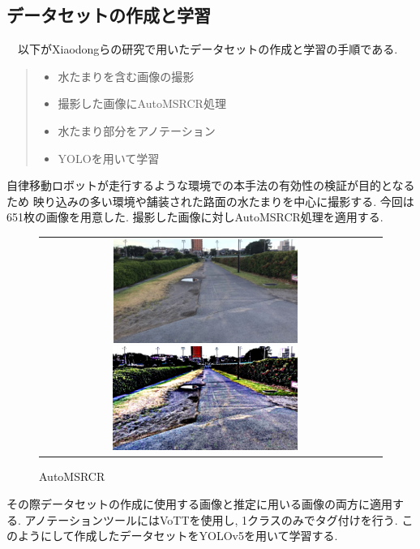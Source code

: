 \documentclass[10pt]{jarticle}
\begin{document}
    \subsection{データセットの作成と学習}
    　以下がXiaodongらの研究で用いたデータセットの作成と学習の手順である. 
    \begin{quote}
        \begin{itemize}
         \item 水たまりを含む画像の撮影
         \item 撮影した画像にAutoMSRCR処理
         \item 水たまり部分をアノテーション
         \item YOLOを用いて学習
        \end{itemize}
       \end{quote}
    自律移動ロボットが走行するような環境での本手法の有効性の検証が目的となるため
    映り込みの多い環境や舗装された路面の水たまりを中心に撮影する. 今回は651枚の画像を用意した. 
    撮影した画像に対しAutoMSRCR処理を適用する. 
    \begin{figure}[H]
        \begin{tabular}{cc}
            \begin{minipage}{.1\textwidth}
                \vspace{5mm}\centering
                \includegraphics[width=2.0\linewidth]{./fig/fig1.png}
                \caption{Original}
                \label{fig_first}
            \end{minipage}
            \begin{minipage}{.5\textwidth}
                \vspace{5mm}\centering\centering
                \includegraphics[width=0.4\linewidth]{./fig/fig2.png}
                \caption{AutoMSRCR}
                \label{fig_second}
            \end{minipage}
        \end{tabular}
    \end{figure}
    その際データセットの作成に使用する画像と推定に用いる画像の両方に適用する. 
    アノテーションツールにはVoTTを使用し, 1クラスのみでタグ付けを行う. 
    このようにして作成したデータセットをYOLOv5を用いて学習する. 
\end{document}
